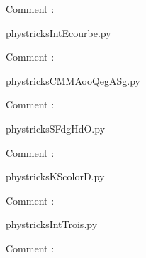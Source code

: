     Comment : 

    \clearpage
    


    \newcommand{\CaptionFigIntEcourbe}{<+Type your caption here+>}
    \begin{center}
        
    \end{center}
    phystricksIntEcourbe.py

    Comment : 

    \clearpage
    


    \newcommand{\CaptionFigCMMAooQegASg}{<+Type your caption here+>}
    \begin{center}
        
    \end{center}
    phystricksCMMAooQegASg.py

    Comment : 

    \clearpage
    


    \newcommand{\CaptionFigSFdgHdO}{<+Type your caption here+>}
    \begin{center}
        
    \end{center}
    phystricksSFdgHdO.py

    Comment : 

    \clearpage
    


    \newcommand{\CaptionFigKScolorD}{<+Type your caption here+>}
    \begin{center}
        
    \end{center}
    phystricksKScolorD.py

    Comment : 

    \clearpage
    


    \newcommand{\CaptionFigIntTrois}{<+Type your caption here+>}
    \begin{center}
        
    \end{center}
    phystricksIntTrois.py

    Comment : 

    \clearpage
    


